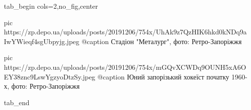  
 
 
 
 


\ifcmt
  tab_begin cols=2,no_fig,center

     pic https://zp.depo.ua/uploads/posts/20191206/754x/UhAk9z7QzHIK6hkd0kNDq9aIwYWieqf4sgUbpyjg.jpeg
		 @caption Стадіон "Металург", фото: Ретро-Запоріжжя 

		 pic https://zp.depo.ua/uploads/posts/20191206/754x/mGQvXCWDq9OUNH5xA6OEY38znc9LswYgzyoDtzSy.jpeg
		 @caption Юний запорізький хокеїст початку 1960-х, фото: Ретро-Запоріжжя 

  tab_end
\fi
